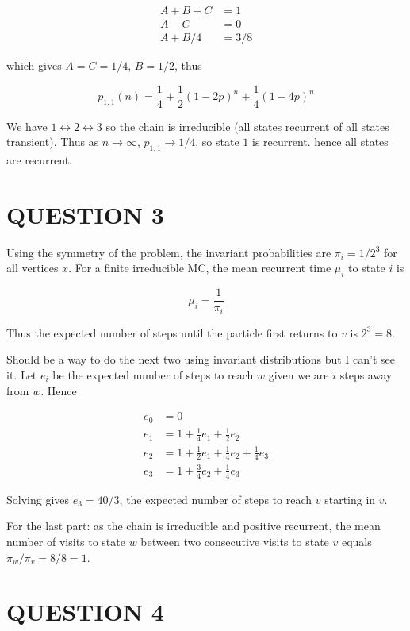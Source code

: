 \documentclass[a4paper]{article}
\begin{document}
\begin{align*}
A + B + C & = 1 \\
A  - C & = 0\\
A + B/4 & = 3/8 	
\end{align*}

which gives $ A = C = 1/4 $, $ B = 1/2 $, thus

\[ p_{1,1}(n) = \frac{1}{4}  + \frac{1}{2}(1-2p)^{n} + \frac{1}{4}(1-4p)^{n} \]

We have $ 1 \leftrightarrow 2 \leftrightarrow 3 $ so the chain is irreducible (all states recurrent of all states transient).
Thus as $ n \to \infty $, $ p_{1,1} \to 1/4 $, so state $ 1 $ is recurrent.  hence all states are recurrent.




\section{QUESTION 3}

Using the symmetry of the problem, the invariant probabilities are $ \pi_{i} = 1/2^{3} $ for all vertices $ x $. For a finite irreducible MC, the mean recurrent time $ \mu_{i} $ to state $ i $ is 

\[ \mu_{i} = \frac{1}{\pi_{i}} \]

Thus the expected number of steps until the particle first returns to $ v $ is $ 2^{3} = 8 $.

Should be a way to do the next two using invariant distributions but I can't see it. Let $ e_{i} $ be the expected number of steps to reach $ w $ given we are $ i $ steps away from $ w $. Hence

\begin{align*}
e_{0} & = 0 \\
e_{1} & = 1 + \frac{1}{4} e_{1} + \frac{1}{2} e_{2} \\
e_{2} & = 1 + \frac{1}{2} e_{1} + \frac{1}{4} e_{2} + \frac{1}{4} e_{3} \\
e_{3} & = 1 + \frac{3}{4} e_{2} + \frac{1}{4} e_{3}  
\end{align*}

Solving gives $ e_{3} = 40/3 $, the expected number of steps to reach $ v $ starting in $ v $.

For the last part: as the chain is irreducible and positive recurrent, the mean number of visits to state $ w $ between two consecutive visits to state $ v $ equals $ \pi_{w} / \pi_{v} = 8/8 = 1$.



\section{QUESTION 4}
\end{document}
